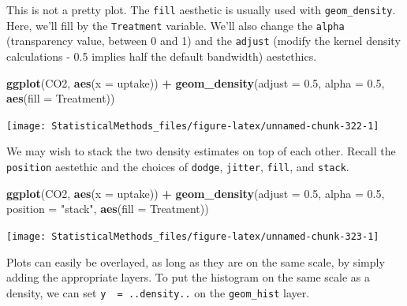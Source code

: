 \documentclass[
]{book}
\newenvironment{Shaded}{\begin{snugshade}}{\end{snugshade}}
\newcommand{\DataTypeTok}[1]{\textcolor[rgb]{0.13,0.29,0.53}{#1}}
\newcommand{\FloatTok}[1]{\textcolor[rgb]{0.00,0.00,0.81}{#1}}
\newcommand{\KeywordTok}[1]{\textcolor[rgb]{0.13,0.29,0.53}{\textbf{#1}}}
\newcommand{\NormalTok}[1]{#1}
\newcommand{\OperatorTok}[1]{\textcolor[rgb]{0.81,0.36,0.00}{\textbf{#1}}}
\newcommand{\StringTok}[1]{\textcolor[rgb]{0.31,0.60,0.02}{#1}}
\theoremstyle{definition}
\theoremstyle{definition}
\theoremstyle{definition}
\theoremstyle{remark}
\begin{document}
This is not a pretty plot. The \texttt{fill} aesthetic is usually used with \texttt{geom\_density}. Here, we'll fill by the \texttt{Treatment} variable. We'll also change the \texttt{alpha} (transparency value, between 0 and 1) and the \texttt{adjust} (modify the kernel density calculations - 0.5 implies half the default bandwidth) aestethics.

\begin{Shaded}
\begin{Highlighting}[]
\KeywordTok{ggplot}\NormalTok{(CO2, }\KeywordTok{aes}\NormalTok{(}\DataTypeTok{x =}\NormalTok{ uptake)) }\OperatorTok{+}
\StringTok{  }\KeywordTok{geom_density}\NormalTok{(}\DataTypeTok{adjust =} \FloatTok{0.5}\NormalTok{, }\DataTypeTok{alpha =} \FloatTok{0.5}\NormalTok{, }\KeywordTok{aes}\NormalTok{(}\DataTypeTok{fill =}\NormalTok{ Treatment))}
\end{Highlighting}
\end{Shaded}

\begin{center}\texttt{[image: StatisticalMethods\_files/figure-latex/unnamed-chunk-322-1]} \end{center}

We may wish to stack the two density estimates on top of each other. Recall the \texttt{position} aestethic and the choices of \texttt{dodge}, \texttt{jitter}, \texttt{fill}, and \texttt{stack}.

\begin{Shaded}
\begin{Highlighting}[]
\KeywordTok{ggplot}\NormalTok{(CO2, }\KeywordTok{aes}\NormalTok{(}\DataTypeTok{x =}\NormalTok{ uptake)) }\OperatorTok{+}\StringTok{ }
\StringTok{  }\KeywordTok{geom_density}\NormalTok{(}\DataTypeTok{adjust =} \FloatTok{0.5}\NormalTok{, }\DataTypeTok{alpha =} \FloatTok{0.5}\NormalTok{, }\DataTypeTok{position =} \StringTok{"stack"}\NormalTok{, }\KeywordTok{aes}\NormalTok{(}\DataTypeTok{fill =}\NormalTok{ Treatment))}
\end{Highlighting}
\end{Shaded}

\begin{center}\texttt{[image: StatisticalMethods\_files/figure-latex/unnamed-chunk-323-1]} \end{center}

Plots can easily be overlayed, as long as they are on the same scale, by simply adding the appropriate layers. To put the histogram on the same scale as a density, we can set \texttt{y\ \ =\ ..density..} on the \texttt{geom\_hist} layer.
\end{document}
